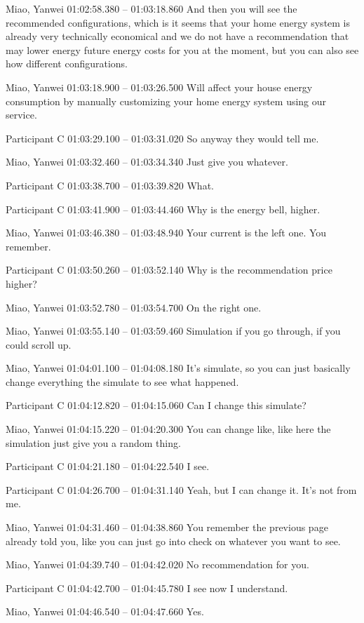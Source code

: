 {Miao, Yanwei 01:02:58.380 -- 01:03:18.860
And then you will see the recommended configurations, which is it seems that your home energy system is already very technically economical and we do not have a recommendation that may lower energy future energy costs for you at the moment, but you can also see how different configurations.

Miao, Yanwei 01:03:18.900 -- 01:03:26.500
Will affect your house energy consumption by manually customizing your home energy system using our service.

Participant C 01:03:29.100 -- 01:03:31.020
So anyway they would tell me.

Miao, Yanwei 01:03:32.460 -- 01:03:34.340
Just give you whatever.

Participant C 01:03:38.700 -- 01:03:39.820
What.

Participant C 01:03:41.900 -- 01:03:44.460
Why is the energy bell, higher.

Miao, Yanwei 01:03:46.380 -- 01:03:48.940
Your current is the left one. You remember.

Participant C 01:03:50.260 -- 01:03:52.140
Why is the recommendation price higher?

Miao, Yanwei 01:03:52.780 -- 01:03:54.700
On the right one.

Miao, Yanwei 01:03:55.140 -- 01:03:59.460
Simulation if you go through, if you could scroll up.

Miao, Yanwei 01:04:01.100 -- 01:04:08.180
It's simulate, so you can just basically change everything the simulate to see what happened.

Participant C 01:04:12.820 -- 01:04:15.060
Can I change this simulate?

Miao, Yanwei 01:04:15.220 -- 01:04:20.300
You can change like, like here the simulation just give you a random thing.

Participant C 01:04:21.180 -- 01:04:22.540
I see.

Participant C 01:04:26.700 -- 01:04:31.140
Yeah, but I can change it. It's not from me.

Miao, Yanwei 01:04:31.460 -- 01:04:38.860
You remember the previous page already told you, like you can just go into check on whatever you want to see.

Miao, Yanwei 01:04:39.740 -- 01:04:42.020
No recommendation for you.

Participant C 01:04:42.700 -- 01:04:45.780
I see now I understand.

Miao, Yanwei 01:04:46.540 -- 01:04:47.660
Yes.

}
